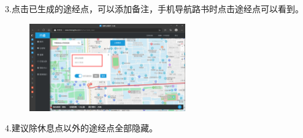 \documentclass{ctexbook}
\begin{document}
3.点击已生成的途经点，可以添加备注，手机导航路书时点击途经点可以看到。
       \begin{figure}[H]
            \begin{center}
            \includegraphics[width=0.6\textwidth]{fig/行者10}
            \end{center}
        \end{figure}

4.建议除休息点以外的途经点全部隐藏。
\end{document}
